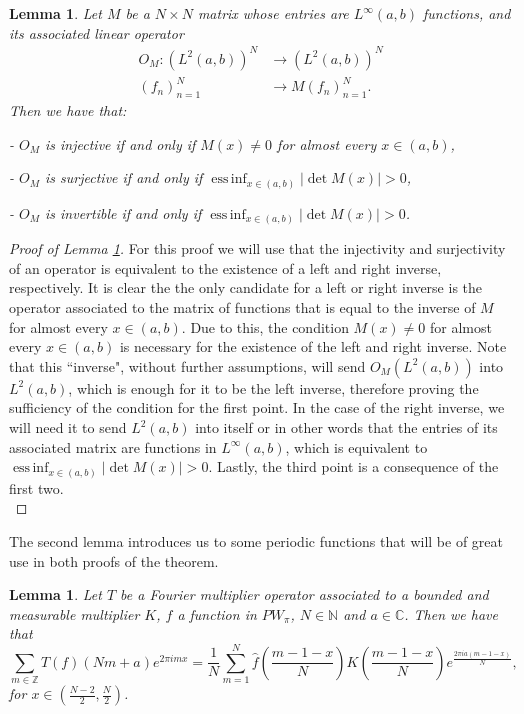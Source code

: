 \documentclass[reqno]{amsart}
\theoremstyle{plain}
\newtheorem{lemma}[theorem]{Lemma}
\theoremstyle{definition}
\numberwithin{equation}{section}
\newcommand{\Z}{{\mathbb Z}}
\newcommand{\N}{{\mathbb N}}
\newcommand{\C}{{\mathbb C}}
\newcommand{\pa}[1]{\left(#1\right)}
\newcommand{\abs}[1]{\left\vert#1\right\vert}
\DeclareMathOperator{\essinf}{ess\,inf}
\providecommand{\abs}[1]{ \lvert#1  \rvert}
\begin{document}
\begin{lemma}\label{lem1}
	Let $M$ be a $N\times N$ matrix whose entries are $L^\infty(a,b)$ functions, and its associated linear operator
	\begin{align*}
		O_M: \pa{L^2(a,b)}^N &\to \pa{L^2(a,b)}^N \\
		(f_n)_{n=1}^N &\to M (f_n)_{n=1}^N.
	\end{align*}
	Then we have that: 
	
	- $O_M$ is injective if and only if $M(x)\neq 0$ for almost every $x\in (a,b)$,
	
	- $O_M$ is surjective if and only if $\essinf_{x\in (a,b)}\abs{\det M(x)}>0$,
	
	- $O_M$ is invertible if and only if $\essinf_{x\in (a,b)}\abs{\det M(x)}>0$.
\end{lemma}

\begin{proof}[Proof of Lemma \ref{lem1}]
	For this proof we will use that the injectivity and surjectivity of an operator is equivalent to the existence of a left and right inverse, respectively. It is clear the the only candidate for a left or right inverse is the operator associated to the matrix of functions that is equal to the inverse of $M$ for almost every $x\in (a,b)$. Due to this, the condition $M(x)\neq 0$ for almost every $x\in (a,b)$ is necessary for the existence of the left and right inverse. Note that this ``inverse", without further assumptions, will send $O_M(L^2(a,b))$ into $L^2(a,b)$, which is enough for it to be the left inverse, therefore proving the sufficiency of the condition for the first point. In the case of the right inverse, we will need it to send $L^2(a,b)$ into itself or in other words that the entries of its associated matrix are functions in $L^\infty(a,b)$, which is equivalent to $\essinf_{x\in (a,b)}\abs{\det M(x)}>0$. Lastly, the third point is a consequence of the first two. \\
\end{proof}
The second lemma introduces us to some periodic functions that will be of great use in both proofs of the theorem.
\begin{lemma}\label{lem2}
    Let $T$ be a Fourier multiplier operator associated to a bounded and measurable multiplier $K$, $f$ a function 
    in $PW_\pi$, $N\in\N$ and $a\in\C$. Then we have that
	$$\sum_{m\in\Z} T(f)(Nm+a) e^{2\pi i m x}
	=\frac{1}{N} \sum_{m=1}^N \widehat{f}\pa{\frac{m-1-x}{N}} K\pa{\frac{m-1-x}{N}}e^\frac{2\pi i a (m-1-x)}{N},$$
	for $x\in \pa{\frac{N-2}{2},\frac{N}{2}}$.
\end{lemma}
\end{document}
